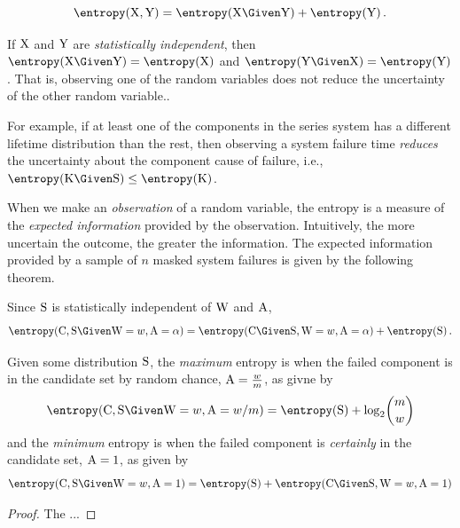 \documentclass[../main.tex]{subfiles}
\begin{document}
\begin{postulate}
\begin{equation}
	\entropy(\RV{X},\RV{Y}) = \entropy(\RV{X} \Given \RV{Y}) + \entropy(\RV{Y})\,.
\end{equation}
\end{postulate}

If $\mathrm{X}$ and $\mathrm{Y}$ are \emph{statistically independent}, then $\entropy(\RV{X} \Given \RV{Y}) = \entropy(\RV{X})$ and $\entropy(\RV{Y} \Given \RV{X}) = \entropy(\RV{Y})$.
That is, observing one of the random variables does not reduce the uncertainty of the other random variable..

For example, if at least one of the components in the series system has a different lifetime distribution than the rest, then observing a system failure time \emph{reduces} the uncertainty about the component cause of failure, i.e., $\entropy(\RV{K} \Given \sv) \leq \entropy(\RV{K})$.

When we make an \emph{observation} of a random variable, the entropy is a measure of the \emph{expected information} provided by the observation.
Intuitively, the more uncertain the outcome, the greater the information.
The expected information provided by a sample of $n$ masked system failures is given by the following theorem.
\begin{theorem}
Since $\mathrm{S}$ is statistically independent of $\mathrm{W}$ and $\mathrm{A}$,
\begin{equation}
	\entropy(\rvcand, \sv \Given \RV{W} = w, \RV{A} = \alpha) = \entropy(\rvcand \Given \sv, \RV{W} = w, \RV{A} = \alpha) + \entropy(\sv)\,.
\end{equation}
\end{theorem}

Given some distribution $\mathrm{S}$, the \emph{maximum} entropy is when the failed component is in the candidate set by random chance, $\mathrm{A} = \frac{w}{m}$, as givne by
\begin{equation}
\entropy(\rvcand, \sv \Given \RV{W}=w,\RV{A}=w/m) = \entropy(\sv) + \log_2 \! \binom{m}{w}
\end{equation}
and the \emph{minimum} entropy is when the failed component is \emph{certainly} in the candidate set, $\mathrm{A}=1$, as given by
\begin{equation}
	\entropy(\rvcand, \sv \Given \RV{W}=w,\RV{A}=1) = \entropy(\sv) + \entropy(\rvcand \Given \sv, \RV{W} = w, \RV{A} = 1)
\end{equation}
\begin{proof}
The ...
\end{proof}
\end{document}
